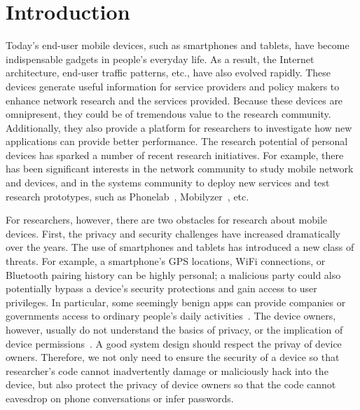 \section{Introduction}

Today's end-user mobile devices, such as smartphones and
tablets, have become indispensable gadgets in people's everyday
life.  As a result, the Internet architecture, end-user traffic
patterns, etc., have also evolved rapidly. These devices 
generate useful information for service providers and policy
makers to enhance network research and the services provided.
Because these devices are omnipresent, they could be of tremendous
value to the research community.
Additionally, they also provide a platform for researchers to
investigate how new applications can provide better performance.
The research potential of personal devices has sparked a number 
of recent research initiatives.
For example, there has been significant interests in the network
community to study mobile network and devices, and in the
systems community to deploy new services and test research
prototypes, such as Phonelab~\cite{phonelab, nandugudi2013phonelab}, 
Mobilyzer~\cite{nikravesh2015mobilyzer}, etc.
					
For researchers, however, there are two obstacles for research
about mobile devices. First, the privacy and security challenges
have increased dramatically over the years. The use of 
smartphones and tablets has introduced a new class of threats. 
For example, a smartphone's GPS locations,
WiFi connections, or Bluetooth pairing history can be highly
personal; a malicious party could also potentially bypass a
device's security protections and gain access to user
privileges. In particular, some seemingly benign apps can provide 
companies or governments access to ordinary 
people's daily activities~\cite{AngryBirds}. The device owners, 
however, usually do not understand the basics of privacy, or the 
implication of device permissions~\cite{camp2015respecting}.
A good system design should respect the privay of device
owners. Therefore, we not only need to ensure the security of a device
so that researcher's code cannot inadvertently damage or
maliciously hack into the device, but also protect the privacy
of device owners so that the code cannot eavesdrop on phone
conversations or infer passwords.


